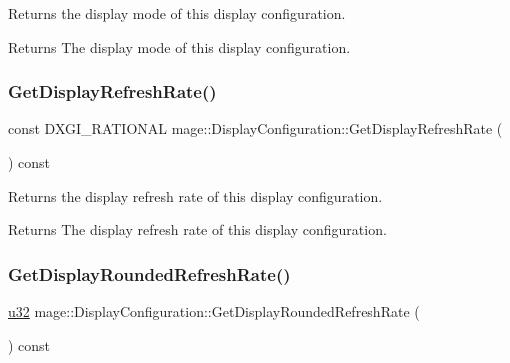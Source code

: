 Returns the display mode of this display configuration.

\begin{DoxyReturn}{Returns}
The display mode of this display configuration. 
\end{DoxyReturn}
\hypertarget{structmage_1_1_display_configuration_aa92237613f8077d189f9504fec371cb8}{}\label{structmage_1_1_display_configuration_aa92237613f8077d189f9504fec371cb8} 
\subsubsection{\texorpdfstring{Get\+Display\+Refresh\+Rate()}{GetDisplayRefreshRate()}}
{\footnotesize\ttfamily const D\+X\+G\+I\+\_\+\+R\+A\+T\+I\+O\+N\+AL mage\+::\+Display\+Configuration\+::\+Get\+Display\+Refresh\+Rate (\begin{DoxyParamCaption}{ }\end{DoxyParamCaption}) const\hspace{0.3cm}{\ttfamily [noexcept]}}

Returns the display refresh rate of this display configuration.

\begin{DoxyReturn}{Returns}
The display refresh rate of this display configuration. 
\end{DoxyReturn}
\hypertarget{structmage_1_1_display_configuration_ae390ed9fb1f00d00ac2b9bf145a3b912}{}\label{structmage_1_1_display_configuration_ae390ed9fb1f00d00ac2b9bf145a3b912} 
\subsubsection{\texorpdfstring{Get\+Display\+Rounded\+Refresh\+Rate()}{GetDisplayRoundedRefreshRate()}}
{\footnotesize\ttfamily \hyperlink{namespacemage_af2b398bf98eb10351f49cad73fe2cc73}{u32} mage\+::\+Display\+Configuration\+::\+Get\+Display\+Rounded\+Refresh\+Rate (\begin{DoxyParamCaption}{ }\end{DoxyParamCaption}) const\hspace{0.3cm}{\ttfamily [noexcept]}}

